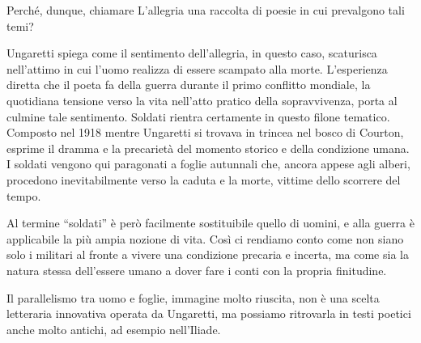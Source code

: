 Perché, dunque, chiamare L’allegria una raccolta di poesie in cui prevalgono tali temi?

Ungaretti spiega come il sentimento dell’allegria, in questo caso, scaturisca nell’attimo in cui l’uomo realizza di essere scampato alla morte. L’esperienza diretta che il poeta fa della guerra durante il primo conflitto mondiale, la quotidiana tensione verso la vita nell’atto pratico della sopravvivenza, porta al culmine tale sentimento. Soldati rientra certamente in questo filone tematico. Composto nel 1918 mentre Ungaretti si trovava in trincea nel bosco di Courton, esprime il dramma e la precarietà del momento storico e della condizione umana. I soldati vengono qui paragonati a foglie autunnali che, ancora appese agli alberi, procedono inevitabilmente verso la caduta e la morte, vittime dello scorrere del tempo.

Al termine “soldati” è però facilmente sostituibile quello di uomini, e alla guerra è applicabile la più ampia nozione di vita. Così ci rendiamo conto come non siano solo i militari al fronte a vivere una condizione precaria e incerta, ma come sia la natura stessa dell’essere umano a dover fare i conti con la propria finitudine.

Il parallelismo tra uomo e foglie, immagine molto riuscita, non è una scelta letteraria innovativa operata da Ungaretti, ma possiamo ritrovarla in testi poetici anche molto antichi, ad esempio nell’Iliade.
